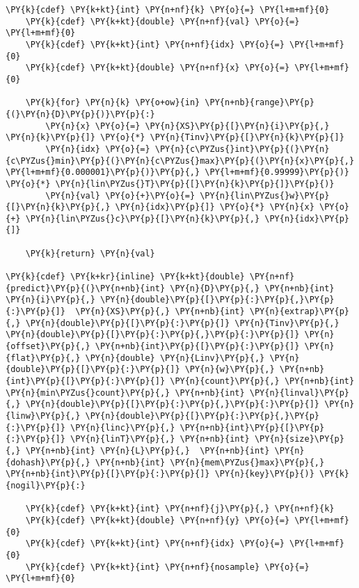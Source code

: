\begin{Verbatim}[commandchars=\\\{\}]
    \PY{k}{cdef} \PY{k+kt}{int} \PY{n+nf}{k} \PY{o}{=} \PY{l+m+mf}{0}
    \PY{k}{cdef} \PY{k+kt}{double} \PY{n+nf}{val} \PY{o}{=} \PY{l+m+mf}{0}
    \PY{k}{cdef} \PY{k+kt}{int} \PY{n+nf}{idx} \PY{o}{=} \PY{l+m+mf}{0}
    \PY{k}{cdef} \PY{k+kt}{double} \PY{n+nf}{x} \PY{o}{=} \PY{l+m+mf}{0}

    \PY{k}{for} \PY{n}{k} \PY{o+ow}{in} \PY{n+nb}{range}\PY{p}{(}\PY{n}{D}\PY{p}{)}\PY{p}{:}
        \PY{n}{x} \PY{o}{=} \PY{n}{XS}\PY{p}{[}\PY{n}{i}\PY{p}{,} \PY{n}{k}\PY{p}{]} \PY{o}{*} \PY{n}{Tinv}\PY{p}{[}\PY{n}{k}\PY{p}{]}
        \PY{n}{idx} \PY{o}{=} \PY{n}{c\PYZus{}int}\PY{p}{(}\PY{n}{c\PYZus{}min}\PY{p}{(}\PY{n}{c\PYZus{}max}\PY{p}{(}\PY{n}{x}\PY{p}{,} \PY{l+m+mf}{0.000001}\PY{p}{)}\PY{p}{,} \PY{l+m+mf}{0.99999}\PY{p}{)} \PY{o}{*} \PY{n}{lin\PYZus{}T}\PY{p}{[}\PY{n}{k}\PY{p}{]}\PY{p}{)}
        \PY{n}{val} \PY{o}{+}\PY{o}{=} \PY{n}{lin\PYZus{}w}\PY{p}{[}\PY{n}{k}\PY{p}{,} \PY{n}{idx}\PY{p}{]} \PY{o}{*} \PY{n}{x} \PY{o}{+} \PY{n}{lin\PYZus{}c}\PY{p}{[}\PY{n}{k}\PY{p}{,} \PY{n}{idx}\PY{p}{]}

    \PY{k}{return} \PY{n}{val}
        
\PY{k}{cdef} \PY{k+kr}{inline} \PY{k+kt}{double} \PY{n+nf}{predict}\PY{p}{(}\PY{n+nb}{int} \PY{n}{D}\PY{p}{,} \PY{n+nb}{int} \PY{n}{i}\PY{p}{,} \PY{n}{double}\PY{p}{[}\PY{p}{:}\PY{p}{,}\PY{p}{:}\PY{p}{]}  \PY{n}{XS}\PY{p}{,} \PY{n+nb}{int} \PY{n}{extrap}\PY{p}{,} \PY{n}{double}\PY{p}{[}\PY{p}{:}\PY{p}{]} \PY{n}{Tinv}\PY{p}{,} \PY{n}{double}\PY{p}{[}\PY{p}{:}\PY{p}{,}\PY{p}{:}\PY{p}{]} \PY{n}{offset}\PY{p}{,} \PY{n+nb}{int}\PY{p}{[}\PY{p}{:}\PY{p}{]} \PY{n}{flat}\PY{p}{,} \PY{n}{double} \PY{n}{Linv}\PY{p}{,} \PY{n}{double}\PY{p}{[}\PY{p}{:}\PY{p}{]} \PY{n}{w}\PY{p}{,} \PY{n+nb}{int}\PY{p}{[}\PY{p}{:}\PY{p}{]} \PY{n}{count}\PY{p}{,} \PY{n+nb}{int} \PY{n}{min\PYZus{}count}\PY{p}{,} \PY{n+nb}{int} \PY{n}{linval}\PY{p}{,} \PY{n}{double}\PY{p}{[}\PY{p}{:}\PY{p}{,}\PY{p}{:}\PY{p}{]} \PY{n}{linw}\PY{p}{,} \PY{n}{double}\PY{p}{[}\PY{p}{:}\PY{p}{,}\PY{p}{:}\PY{p}{]} \PY{n}{linc}\PY{p}{,} \PY{n+nb}{int}\PY{p}{[}\PY{p}{:}\PY{p}{]} \PY{n}{linT}\PY{p}{,} \PY{n+nb}{int} \PY{n}{size}\PY{p}{,} \PY{n+nb}{int} \PY{n}{L}\PY{p}{,}  \PY{n+nb}{int} \PY{n}{dohash}\PY{p}{,} \PY{n+nb}{int} \PY{n}{mem\PYZus{}max}\PY{p}{,} \PY{n+nb}{int}\PY{p}{[}\PY{p}{:}\PY{p}{]} \PY{n}{key}\PY{p}{)} \PY{k}{nogil}\PY{p}{:}

    \PY{k}{cdef} \PY{k+kt}{int} \PY{n+nf}{j}\PY{p}{,} \PY{n+nf}{k}
    \PY{k}{cdef} \PY{k+kt}{double} \PY{n+nf}{y} \PY{o}{=} \PY{l+m+mf}{0}
    \PY{k}{cdef} \PY{k+kt}{int} \PY{n+nf}{idx} \PY{o}{=} \PY{l+m+mf}{0}
    \PY{k}{cdef} \PY{k+kt}{int} \PY{n+nf}{nosample} \PY{o}{=} \PY{l+m+mf}{0}


\end{Verbatim}
